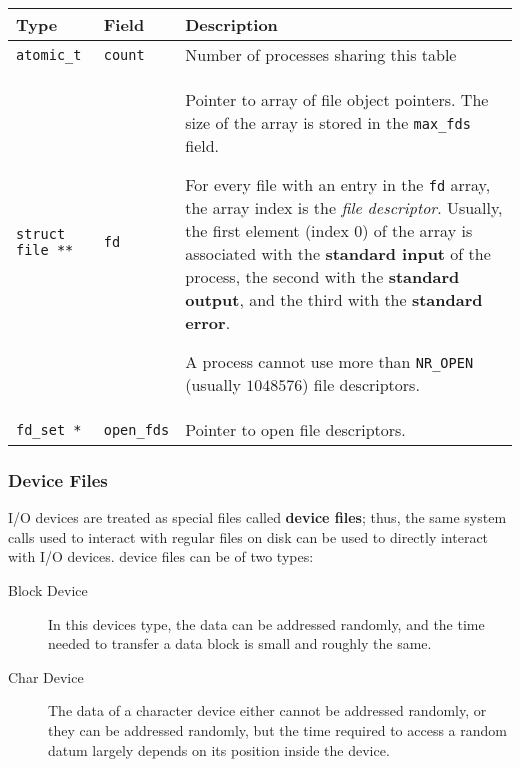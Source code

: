 \documentclass[10pt,a4paper]{article}
\begin{document}
\begin{center}
\begin{tabular}{l|l|p{13cm}} 

\toprule
Type & Field & Description \\
\midrule

\texttt{atomic\_t} & \texttt{count} & Number of processes sharing this table

\\

\texttt{struct file **} & \texttt{fd} & Pointer to array of file object pointers. The size of the array is stored in the \texttt{max\_fds} field. 

For every file with an entry in the \texttt{fd} array, the array index is the \textit{file descriptor}. Usually, the first element (index 0) of the array is associated with the \textbf{standard input} of the process, the second with the \textbf{standard output}, and the third with the \textbf{standard error}.

A process cannot use more than \texttt{NR\_OPEN} (usually $1048576$) file descriptors.

\\

\texttt{fd\_set *} & \texttt{open\_fds} & Pointer to open file descriptors.




\\
 
\bottomrule
\end{tabular}
\end{center}

\subsubsection{Device Files}

I/O devices are treated as special files called \textbf{device files}; thus, the same system calls used to interact with regular files on disk can be used to directly interact with I/O devices. device files can be of two types: 

\begin{description}
\item[Block Device] In this devices type, the data can be addressed randomly, and the time needed to transfer a data block is small and roughly the same.
\item[Char Device] The data of a character device either cannot be addressed randomly, or they can be addressed randomly, but the time required to access a random datum largely depends on its position inside the device.
\end{description} 
\end{document}
